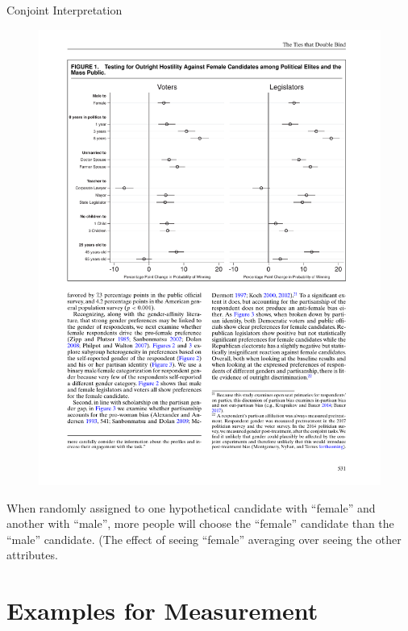 \documentclass[
  ignorenonframetext,
]{beamer}
\begin{document}
\begin{frame}{Conjoint Interpretation}
\protect\hypertarget{conjoint-interpretation}{}
\begin{figure}

{\centering \includegraphics[width=0.8\linewidth]{./figs/survey-exp-teele-2018-results-a} 

}

\end{figure}

When randomly assigned to one hypothetical candidate with ``female'' and
another with ``male'', more people will choose the ``female'' candidate
than the ``male'' candidate. (The effect of seeing ``female'' averaging
over seeing the other attributes.
\end{frame}

\hypertarget{examples-for-measurement}{%
\section{Examples for Measurement}\label{examples-for-measurement}}
\end{document}
